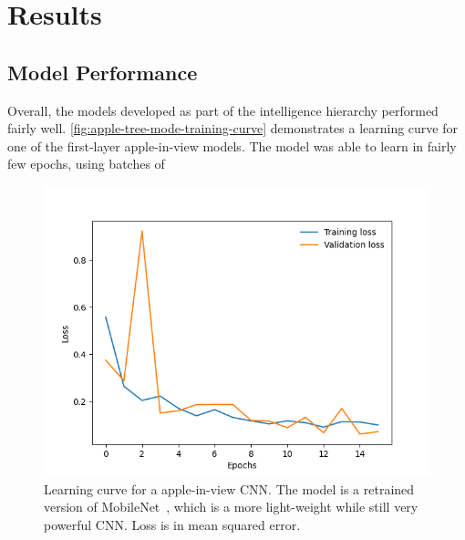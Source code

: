 \section{Results}
\subsection{Model Performance}\label{subsec:model-performance}
Overall, the models developed as part of the intelligence hierarchy performed fairly well.
\autoref{fig:apple-tree-mode-training-curve} demonstrates a learning curve for one of the first-layer apple-in-view models.
The model was able to learn in fairly few epochs, using batches of 

\begin{figure}[!htb]
    \centering
    \includegraphics[width=\columnwidth,keepaspectratio]
    {./figures/mobile_model_apple_trees_16its_2022-11-15_training_curve}
    \caption{
        Learning curve for a apple-in-view CNN.
        The model is a retrained version of MobileNet~\cite{Sandler2018,PyTorchMobileNet}, which is a more light-weight while still very powerful CNN.
        Loss is in mean squared error.
    }
    \label{fig:apple-tree-mode-training-curve}
\end{figure}


